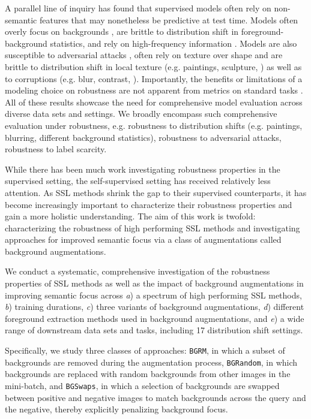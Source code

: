 \documentclass[twoside,11pt]{article}
\newcommand{\bgrm}{\texttt{BG\textunderscore RM}}
\newcommand{\bgswaps}{\texttt{BG\textunderscore Swaps}}
\newcommand{\bgrand}{\texttt{BG\textunderscore Random}}
\begin{document}
A parallel line of inquiry has found that supervised models often rely on non-semantic features that may nonetheless be predictive at test time. Models often overly focus on backgrounds \citep{xiao2020noise, sehwag2020time, beery_recognition_2018}, are brittle to distribution shift in foreground-background statistics, and rely on high-frequency information \citep{jo2017measuring, ilyas_neurips_2020_features_not_bugs}. Models are also susceptible to adversarial attacks \citep{goodfellow_fgsm, jo2017measuring}, often rely on texture over shape \citep{geirhos2019imagenettrained, geirhos2020surprising, hermann2019origins} and are brittle to distribution shift in local texture (e.g. paintings, sculpture, \citet{hendrycks_many_2021}) as well as to corruptions (e.g. blur, contrast, \citet{hendrycks_benchmarking_2019}). Importantly, the benefits or limitations of a modeling choice on robustness are not apparent from metrics on standard tasks \citep{hendrycks_using_2019}. All of these results showcase the need for comprehensive model evaluation across diverse data sets and settings. We broadly encompass such comprehensive evaluation under robustness, e.g. robustness to distribution shifts (e.g. paintings, blurring, different background statistics), robustness to adversarial attacks, robustness to label scarcity.

While there has been much work investigating robustness properties in the supervised setting, the self-supervised setting has received relatively less attention. As SSL methods shrink the gap to their supervised counterparts, it has become increasingly important to characterize their robustness properties and gain a more holistic understanding.
The aim of this work is twofold: characterizing the robustness of high performing SSL methods and investigating approaches for improved semantic focus via a class of augmentations called background augmentations.


We conduct a systematic, comprehensive investigation of the robustness properties of SSL methods as well as the impact of background augmentations in improving semantic focus across \textit{a}) a spectrum of high performing SSL methods, \textit{b}) training durations, \textit{c}) three variants of background augmentations, \textit{d}) different foreground extraction methods used in background augmentations, and \textit{e}) a wide range of downstream data sets and tasks, including 17 distribution shift settings.

Specifically, we study three classes of approaches: \bgrm, in which a subset of backgrounds are removed during the augmentation process, \bgrand, in which backgrounds are replaced with random backgrounds from other images in the mini-batch, and \bgswaps, in which a selection of backgrounds are swapped between positive and negative images to match backgrounds across the query and the negative, thereby explicitly penalizing background focus. 
\end{document}
